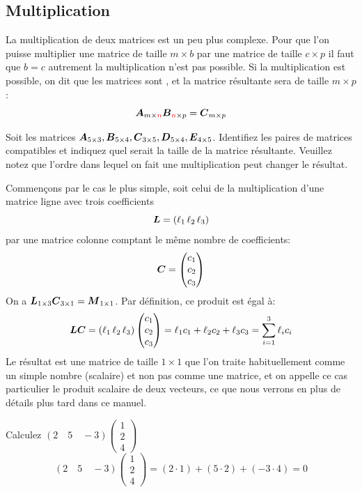 \subsection{Multiplication}
La multiplication de deux matrices est un peu plus complexe.  
Pour que l'on puisse multiplier une matrice de taille $m\times b$ par une matrice
de taille $c\times p$ il faut que $b=c$ autrement la multiplication n'est pas possible.  
Si la multiplication est possible, on dit que les matrices sont , et la matrice résultante
sera de taille $m\times p$:
\[
\boldsymbol{A}_{m\times \textcolor{red}{n}} \boldsymbol{B}_{\textcolor{red}{n}\times p} = \boldsymbol{C}_{m\times p}
\]
\begin{exerciceB}
Soit les matrices $\boldsymbol{A}_{5\times 3}, \boldsymbol{B}_{5\times 4}, \boldsymbol{C}_{3\times 5}, \boldsymbol{D}_{5\times 4}, \boldsymbol{E}_{4\times 5}$.
Identifiez les paires de matrices compatibles et indiquez quel serait la taille de la matrice résultante.
Veuillez notez que l'ordre dans lequel on fait une multiplication peut changer le résultat.
\end{exerciceB}

Commençons par le cas le plus simple, soit celui de la multiplication d'une matrice ligne avec trois coefficients
\[
\boldsymbol{L} = ( \ell_1 \, \ell_2\, \ell_3)
\]
%
 par une matrice colonne comptant le même nombre de coefficients:
 \[
\boldsymbol{C} =  \begin{pmatrix}c_1 \\ c_2 \\ c_3\end{pmatrix}
\]
On a $\boldsymbol{L}_{1\times 3} \boldsymbol{C}_{3\times 1} = \boldsymbol{M}_{1\times 1}$.  Par définition, ce produit est égal à:
\[
\boldsymbol{L} \boldsymbol{C}  = ( \ell_1\, \ell_2\, \ell_3)\begin{pmatrix}c_1 \\ c_2 \\ c_3\end{pmatrix} = 
 \ell_1 c_1 + \ell_2 c_2 + \ell_3 c_3 = \sum_{i=1}^3 \ell_i c_i
\]
Le résultat est une matrice de taille $1\times 1$ que l'on traite habituellement comme un simple nombre (scalaire) 
et non pas comme une matrice, et on appelle ce cas particulier le produit scalaire de deux vecteurs, ce
que nous verrons en plus de détails plus tard dans ce manuel.

\begin{exemple}
Calculez $\displaystyle (2 \quad 5 \quad -3)\begin{pmatrix}
1 \\ 2 \\ 4
\end{pmatrix}$
\solution
\[(2 \quad 5 \quad -3)\begin{pmatrix}
1 \\ 2 \\ 4
\end{pmatrix} = (2\cdot 1) + (5\cdot 2) + (-3\cdot 4) = 0
\]
\end{exemple}

